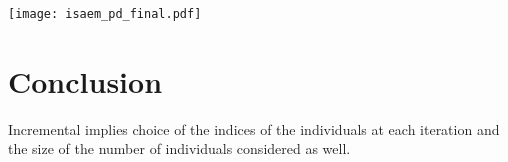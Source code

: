 \documentclass[a0,portrait]{a0poster}
\begin{document}
\begin{multicols}{2}
\begin{center}%
\texttt{[image: isaem\_pd\_final.pdf]}
\label{fig-dyn}
\end{center}\vspace{1cm}



\section{Conclusion}
\color{Navy} %
Incremental implies choice of the indices of the individuals at each iteration and the size of the number of individuals considered as well.


\color{DarkSlateGray} %






\small
\nocite{*} %







\end{multicols}
\begin{center}
\end{center}
\end{document}
